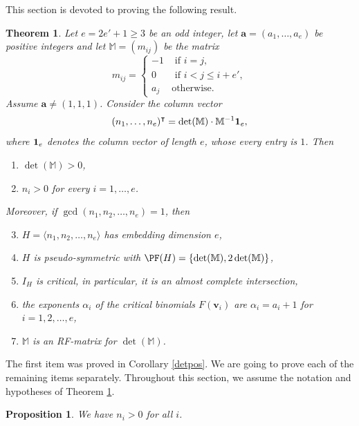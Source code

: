 \documentclass[11pt,twoside]{amsart}
\def\bv{{\mathbf v}}
\def\ba{{\mathbf a}}
\def\bbM{{\mathbb M}}
\newtheorem{thm}[Theorem]{Theorem}
\newtheorem{prop}[Theorem]{Proposition}
\theoremstyle{definition}
\numberwithin{equation}{section}
\begin{document}
This section is devoted to proving the following result.

\begin{thm}\label{conversemainTh}
Let $e= 2e'+1\geq 3$ be an odd integer,
let $\ba = (a_1, \ldots , a_e)$ be positive integers and let  $\bbM= (m_{ij})$ be the matrix
\[ m_{ij} = \left\{
\begin{array}{ll}
-1 & \text{ if }i=j, \\
0  & \text{ if } i < j \le i+e',  \\
a_j & \text{otherwise}.
\end{array}
\right.\]
Assume $\ba \ne (1,1,1)$.
Consider the column vector
\[(n_1, \ldots , n_e)^\intercal = \det(\bbM) \cdot \bbM^{-1}{\bf 1}_e,\]
 where  ${\bf 1}_e$ denotes the column vector of length $e$, 
whose every entry is $1$.
Then
\begin{enumerate}
    \item $\det(\bbM)>0$,
\item $n_i > 0$ for every $i=1,\ldots,e$.
\end{enumerate}
Moreover, if $\gcd(n_1, n_2, \ldots, n_e)=1$, then
\begin{enumerate}
\setcounter{enumi}{2}
\item $H = \langle n_1, n_2, \ldots, n_e \rangle$ has embedding dimension $e$,
\item $H$ is pseudo-symmetric with $\PF(H) = \{\det(\bbM),2\det(\bbM)\}$,
\item $I_H$ is critical, in particular, it is an almost complete intersection,
\item the exponents $\alpha_i$ of the critical binomials $F(\bv_i)$ are $\alpha_i = a_i +1$ 
for $i=1,2, \ldots, e$,
\item $\bbM$ is an RF-matrix for $\det(\bbM)$.
\end{enumerate}

\end{thm}
The first item was proved in Corollary \ref{detpos}. 
We are going to prove each of the remaining items separately.
Throughout this section,
we assume the notation and hypotheses of Theorem \ref{conversemainTh}.
\begin{prop}
We have $n_i>0$ for all $i$.
\end{prop}
\end{document}
